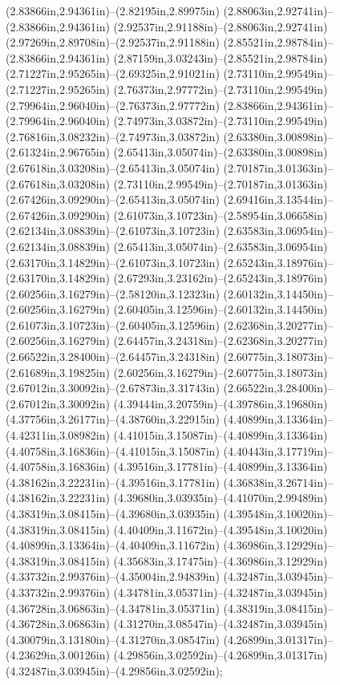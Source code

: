 (2.83866in,2.94361in)--(2.82195in,2.89975in) (2.88063in,2.92741in)--(2.83866in,2.94361in) (2.92537in,2.91188in)--(2.88063in,2.92741in) (2.97269in,2.89708in)--(2.92537in,2.91188in) (2.85521in,2.98784in)--(2.83866in,2.94361in) (2.87159in,3.03243in)--(2.85521in,2.98784in) (2.71227in,2.95265in)--(2.69325in,2.91021in) (2.73110in,2.99549in)--(2.71227in,2.95265in) (2.76373in,2.97772in)--(2.73110in,2.99549in) (2.79964in,2.96040in)--(2.76373in,2.97772in) (2.83866in,2.94361in)--(2.79964in,2.96040in) (2.74973in,3.03872in)--(2.73110in,2.99549in) (2.76816in,3.08232in)--(2.74973in,3.03872in) (2.63380in,3.00898in)--(2.61324in,2.96765in) (2.65413in,3.05074in)--(2.63380in,3.00898in) (2.67618in,3.03208in)--(2.65413in,3.05074in) (2.70187in,3.01363in)--(2.67618in,3.03208in) (2.73110in,2.99549in)--(2.70187in,3.01363in) (2.67426in,3.09290in)--(2.65413in,3.05074in) (2.69416in,3.13544in)--(2.67426in,3.09290in) (2.61073in,3.10723in)--(2.58954in,3.06658in) (2.62134in,3.08839in)--(2.61073in,3.10723in) (2.63583in,3.06954in)--(2.62134in,3.08839in) (2.65413in,3.05074in)--(2.63583in,3.06954in) (2.63170in,3.14829in)--(2.61073in,3.10723in) (2.65243in,3.18976in)--(2.63170in,3.14829in) (2.67293in,3.23162in)--(2.65243in,3.18976in) (2.60256in,3.16279in)--(2.58120in,3.12323in) (2.60132in,3.14450in)--(2.60256in,3.16279in) (2.60405in,3.12596in)--(2.60132in,3.14450in) (2.61073in,3.10723in)--(2.60405in,3.12596in) (2.62368in,3.20277in)--(2.60256in,3.16279in) (2.64457in,3.24318in)--(2.62368in,3.20277in) (2.66522in,3.28400in)--(2.64457in,3.24318in) (2.60775in,3.18073in)--(2.61689in,3.19825in) (2.60256in,3.16279in)--(2.60775in,3.18073in) (2.67012in,3.30092in)--(2.67873in,3.31743in) (2.66522in,3.28400in)--(2.67012in,3.30092in) (4.39444in,3.20759in)--(4.39786in,3.19680in) (4.37756in,3.26177in)--(4.38760in,3.22915in) (4.40899in,3.13364in)--(4.42311in,3.08982in) (4.41015in,3.15087in)--(4.40899in,3.13364in) (4.40758in,3.16836in)--(4.41015in,3.15087in) (4.40443in,3.17719in)--(4.40758in,3.16836in) (4.39516in,3.17781in)--(4.40899in,3.13364in) (4.38162in,3.22231in)--(4.39516in,3.17781in) (4.36838in,3.26714in)--(4.38162in,3.22231in) (4.39680in,3.03935in)--(4.41070in,2.99489in) (4.38319in,3.08415in)--(4.39680in,3.03935in) (4.39548in,3.10020in)--(4.38319in,3.08415in) (4.40409in,3.11672in)--(4.39548in,3.10020in) (4.40899in,3.13364in)--(4.40409in,3.11672in) (4.36986in,3.12929in)--(4.38319in,3.08415in) (4.35683in,3.17475in)--(4.36986in,3.12929in) (4.33732in,2.99376in)--(4.35004in,2.94839in) (4.32487in,3.03945in)--(4.33732in,2.99376in) (4.34781in,3.05371in)--(4.32487in,3.03945in) (4.36728in,3.06863in)--(4.34781in,3.05371in) (4.38319in,3.08415in)--(4.36728in,3.06863in) (4.31270in,3.08547in)--(4.32487in,3.03945in) (4.30079in,3.13180in)--(4.31270in,3.08547in) (4.26899in,3.01317in)--(4.23629in,3.00126in) (4.29856in,3.02592in)--(4.26899in,3.01317in) (4.32487in,3.03945in)--(4.29856in,3.02592in);
